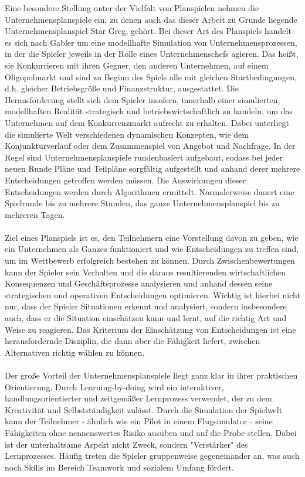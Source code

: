 Eine besondere Stellung unter der Vielfalt von Planspielen nehmen die Unternehmensplanspiele ein, zu denen auch das dieser Arbeit zu Grunde liegende Unternehmensplanspiel Star Greg, gehört. Bei dieser Art des Planspiels handelt es sich nach Gabler um eine modellhafte Simulation von Unternehmensprozessen, in der die Spieler jeweils in der Rolle eines Unternehmenschefs agieren. Das heißt, sie Konkurrieren mit ihren Gegner, den anderen Unternehmen, auf einem Oligopolmarkt und sind zu Beginn des Spiels alle mit gleichen Startbedingungen, d.h. gleicher Betriebsgröße und Finanzstruktur, ausgestattet. Die Herausforderung stellt sich dem Spieler insofern, innerhalb einer simulierten, modellhaften Realität strategisch und betriebswirtschaftlich zu handeln, um das Unternehmen auf dem Konkurrenzmarkt aufrecht zu erhalten. Dabei  unterliegt die simulierte Welt verschiedenen dynamischen Konzepten, wie dem Konjunkturverlauf oder dem Zusammenspiel von Angebot und Nachfrage. In der Regel sind Unternehmensplanspiele rundenbasiert aufgebaut, sodass bei jeder neuen Runde Pläne und Teilpläne sorgfältig aufgestellt und anhand derer mehrere Entscheidungen getroffen werden müssen. Die Auswirkungen dieser Entscheidungen werden durch Algorithmen ermittelt. Normalerweise dauert eine Spielrunde bis zu mehrere Stunden, das ganze Unternehmensplanspiel bis zu mehreren Tagen.
\\
\\
Ziel eines Planspiels ist es, den Teilnehmern eine Vorstellung davon zu geben, wie ein Unternehmen als Ganzes funktioniert und wie Entscheidungen zu treffen sind, um im Wettbewerb erfolgreich bestehen zu können. Durch Zwischenbewertungen kann der Spieler sein Verhalten und die daraus resultierenden wirtschaftlichen Konsequenzen und Geschäftsprozesse analysieren und anhand dessen seine strategischen und operativen Entscheidungen optimieren. Wichtig ist hierbei nicht nur, dass der Spieler Situationen erkennt und analysiert, sondern insbesondere auch, dass er die Situation einschätzen kann und lernt, auf die richtig Art und Weise zu reagieren. Das Kriterium der Einschätzung von Entscheidungen ist eine herausfordernde Disziplin, die dann aber die Fähigkeit liefert, zwischen Alternativen richtig wählen zu können. 
\\
\\
Der große Vorteil der Unternehmensplanspiele liegt ganz klar in ihrer praktischen Orientierung. Durch Learning-by-doing wird ein interaktiver, handlungsorientierter und zeitgemäßer Lernprozess verwendet, der zu dem Kreativität und Selbstständigkeit zulässt. Durch die Simulation der Spielwelt kann der Teilnehmer - ähnlich wie ein Pilot in einem Flugsimulator - seine Fähigkeiten ohne nennenswertes Risiko ausüben und auf die Probe stellen. Dabei ist der unterhaltsame Aspekt nicht Zweck, sondern "Verstärker" des Lernprozesses. Häufig treten die Spieler gruppenweise gegeneinander an, was auch noch Skills im Bereich Teamwork und sozialem Umfang fördert. 